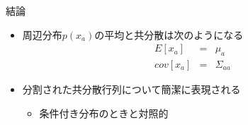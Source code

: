 \begin{frame}{結論}
 \begin{itemize}
  \item 周辺分布$p(x_a)$の平均と共分散は次のようになる
        \begin{eqnarray}
         E[x_a] &=&  \mu_a\\
         cov[x_a]&=&\Sigma_{aa}
        \end{eqnarray}
  \item 分割された共分散行列について簡潔に表現される
        \begin{itemize}
         \item 条件付き分布のときと対照的
        \end{itemize}
 \end{itemize}
\end{frame}
